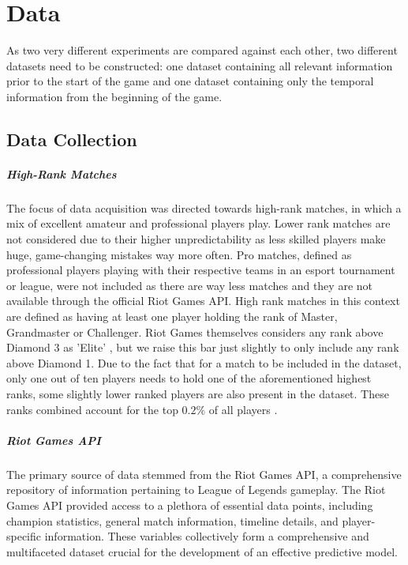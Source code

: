 \documentclass[12pt, a4paper, headinclude, twoside, plainheadsepline, open=right, numbers=noenddot, hidelinks, toc=listof, toc=bibliography]{scrreprt}
\begin{document}
\chapter{Data}
\label{chap:data}

As two very different experiments are compared against each other, two different datasets need to be constructed: one dataset containing all relevant information prior to the start of the game and one dataset containing only the temporal information from the beginning of the game.


\section{Data Collection}
\label{sec:datacoll}

\paragraph{High-Rank Matches}
The focus of data acquisition was directed towards high-rank matches, in which a mix of excellent amateur and professional players play.
Lower rank matches are not considered due to their higher unpredictability as less skilled players make huge, game-changing mistakes way more often.
Pro matches, defined as professional players playing with their respective teams in an esport tournament or league, were not included as there are way less matches and they are not available through the official Riot Games API.
High rank matches in this context are defined as having at least one player holding the rank of Master, Grandmaster or Challenger.
Riot Games themselves considers any rank above Diamond 3 as 'Elite' \cite{riotgamesDevBalanceFramework2020}, but we raise this bar just slightly to only include any rank above Diamond 1.
Due to the fact that for a match to be included in the dataset, only one out of ten players needs to hold one of the aforementioned highest ranks, some slightly lower ranked players are also present in the dataset.
These ranks combined account for the top $0.2\%$ of all players \cite{riotgamesRankedTiersDivisions2023}.
\paragraph{Riot Games API}
The primary source of data stemmed from the Riot Games API, a comprehensive repository of information pertaining to League of Legends gameplay.
The Riot Games API provided access to a plethora of essential data points, including champion statistics, general match information, timeline details, and player-specific information.
These variables collectively form a comprehensive and multifaceted dataset crucial for the development of an effective predictive model.
\end{document}
